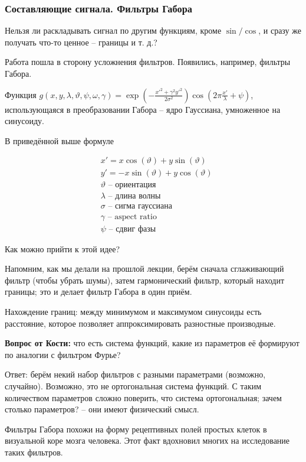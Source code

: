 \documentclass[main.tex]{subfiles}
\begin{document}
\subsubsection{Составляющие сигнала. Фильтры Габора}

Нельзя ли раскладывать сигнал по другим функциям, кроме $ \sin / \cos $, и сразу же получать что-то ценное -- границы и т. д.?

Работа пошла в сторону усложнения фильтров. Появились, например, фильтры Габора.

Функция $ g(x, y, \lambda, \vartheta, \psi, \omega, \gamma ) = \exp \left( - \frac{x'^2 + \gamma^2 y'^2}{2 \sigma^2}\right) \cos \left(2\pi \frac{x'}{\lambda} + \psi \right) $,
использующаяся в преобразовании Габора -- ядро Гауссиана, умноженное на синусоиду.

В приведённой выше формуле

\begin{align*}
& x' = x \cos(\vartheta) + y \sin(\vartheta) \\
& y' = -x \sin(\vartheta) + y \cos(\vartheta) \\
& \vartheta \text{ -- ориентация} \\
& \lambda \text{ -- длина волны} \\
& \sigma \text{ -- сигма гауссиана} \\
& \gamma \text{ -- aspect ratio} \\
& \psi \text{ -- сдвиг фазы}
\end{align*}

Как можно прийти к этой идее?

Напомним, как мы делали на прошлой лекции, берём сначала сглаживающий фильтр (чтобы убрать шумы), затем гармонический фильтр, который находит границы; это и делает фильтр Габора в один приём.

Нахождение границ: между минимумом и максимумом синусоиды есть расстояние, которое позволяет аппроксимировать разностные производные.

\textbf{Вопрос от Кости:} что есть система функций, какие из параметров её формируют по аналогии с фильтром Фурье?

Ответ: берём некий набор фильтров с разными параметрами (возможно, случайно).
Возможно, это не ортогональная система функций.
С таким количеством параметров сложно поверить, что система ортогональная; зачем столько параметров? -- они имеют физический смысл. 

Фильтры Габора похожи на форму рецептивных полей простых клеток в визуальной коре мозга человека.
Этот факт вдохновил многих на исследование таких фильтров.
\end{document}
